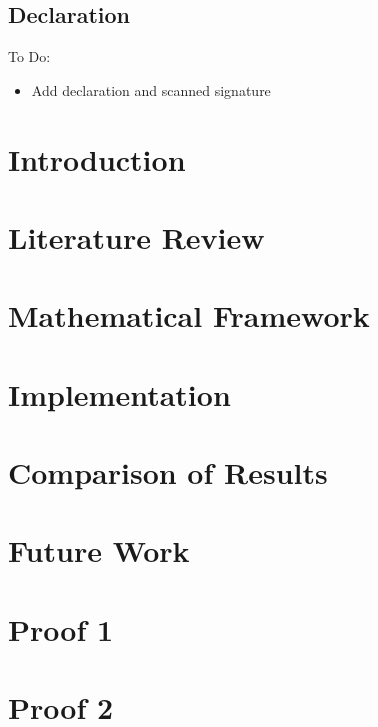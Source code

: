 \documentclass[12pt, twoside, openright]{report}
\begin{document}
\newpage
\section*{Declaration}

{\color{red}
To Do:
\begin{itemize}
	\item Add declaration and scanned signature
\end{itemize}
}

\tableofcontents


\chapter{Introduction}

\setcounter{page}{1}

\Blindtext

\chapter{Literature Review}


\chapter{Mathematical Framework}

\blindmathpaper

\chapter{Implementation}

\blindtext
\blinditemize
\blindtext
\blindenumerate
\Blindtext
\blinditemize
\Blindtext
\blinddescription
\Blindtext

\chapter{Comparison of Results}

\Blindtext

\chapter{Future Work}

\Blindtext

{}


\appendix

\chapter{Proof 1}

\blindmathtrue
\Blindtext

\chapter{Proof 2}

\blindtext
\end{document}
